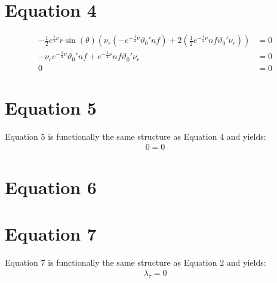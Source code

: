 \documentclass[12pt]{article}
\begin{document}
\section*{Equation 4}

\begin{align}
-\frac{1}{2} e^{\frac{1}{2} \nu} r \sin(\theta) 
\left(
    \nu_r \left( 
        - e^{-\frac{1}{2} \nu} \vartheta_0' nf
    \right)
    + 2 \left(
        \frac{1}{2} e^{-\frac{1}{2} \nu} nf \vartheta_0' \nu_r
    \right)
\right) &= 0 \nonumber \\ 
    - \nu_r e^{-\frac{1}{2} \nu} \vartheta_0' nf
    + e^{-\frac{1}{2} \nu} nf \vartheta_0' \nu_r &= 0 \nonumber \\
0 &= 0
\end{align}

\section*{Equation 5}

Equation 5 is functionally the same structure as Equation 4 and yields:
\begin{align}
  0 = 0
\end{align}

\section*{Equation 6}

\section*{Equation 7}

Equation 7 is functionally the same structure as Equation 2 and yields:
\begin{align}
  \lambda_\tau = 0
\end{align}
\end{document}
